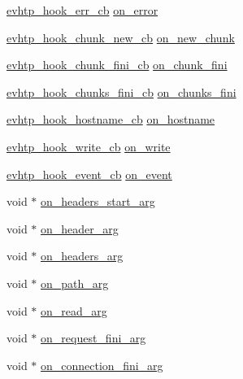 \begin{DoxyCompactItemize}
\hyperlink{evhtp_8h_a0a732d68aef3e27b8431cab5c1e9c0a2}{evhtp\-\_\-hook\-\_\-err\-\_\-cb} \hyperlink{structevhtp__hooks__s_ae5840f4ca13d16882f8bc84b306a7d9f}{on\-\_\-error}
\item 
\hyperlink{evhtp_8h_a28c0bf6ad71170459cd215edb41193ba}{evhtp\-\_\-hook\-\_\-chunk\-\_\-new\-\_\-cb} \hyperlink{structevhtp__hooks__s_a16e5898ad1b546019685b4c6854a0dfb}{on\-\_\-new\-\_\-chunk}
\item 
\hyperlink{evhtp_8h_a62e776563826a3f08a5b31b4738d07fa}{evhtp\-\_\-hook\-\_\-chunk\-\_\-fini\-\_\-cb} \hyperlink{structevhtp__hooks__s_a7905e89a5d4086104635ddc867e02fe1}{on\-\_\-chunk\-\_\-fini}
\item 
\hyperlink{evhtp_8h_afa076ce7b72bc507c919d9914b6cb8c3}{evhtp\-\_\-hook\-\_\-chunks\-\_\-fini\-\_\-cb} \hyperlink{structevhtp__hooks__s_a0801884b636d618c7fa881668996ce4a}{on\-\_\-chunks\-\_\-fini}
\item 
\hyperlink{evhtp_8h_ae907068ab1775d9dcbab30991f0817f8}{evhtp\-\_\-hook\-\_\-hostname\-\_\-cb} \hyperlink{structevhtp__hooks__s_a6de1097bdc1ddb3bf44c994e4e086f02}{on\-\_\-hostname}
\item 
\hyperlink{evhtp_8h_ad38e035817c84ac1a152115aab40c3cf}{evhtp\-\_\-hook\-\_\-write\-\_\-cb} \hyperlink{structevhtp__hooks__s_a1f9dee4096564721214ecfe05707510a}{on\-\_\-write}
\item 
\hyperlink{evhtp_8h_a12d14d9844d9a2eb8d9a9f81eeca192e}{evhtp\-\_\-hook\-\_\-event\-\_\-cb} \hyperlink{structevhtp__hooks__s_ac498d61ef3709ea14c1351eea77ed05d}{on\-\_\-event}
\item 
void $\ast$ \hyperlink{structevhtp__hooks__s_a5901f165f65b2ec87c0c0b274950be9f}{on\-\_\-headers\-\_\-start\-\_\-arg}
\item 
void $\ast$ \hyperlink{structevhtp__hooks__s_a854ac79bb3d5399c4ed366e542eea302}{on\-\_\-header\-\_\-arg}
\item 
void $\ast$ \hyperlink{structevhtp__hooks__s_aa4ea4765f3de173070b313ee276d8a43}{on\-\_\-headers\-\_\-arg}
\item 
void $\ast$ \hyperlink{structevhtp__hooks__s_ac828d71921d79c53bd3782082a392d09}{on\-\_\-path\-\_\-arg}
\item 
void $\ast$ \hyperlink{structevhtp__hooks__s_af1ca4346719c7e3b841867e153bc7504}{on\-\_\-read\-\_\-arg}
\item 
void $\ast$ \hyperlink{structevhtp__hooks__s_a6ff6528fe6d2018c55a718ca829e00be}{on\-\_\-request\-\_\-fini\-\_\-arg}
\item 
void $\ast$ \hyperlink{structevhtp__hooks__s_a85b8e90c05beef54c71c79ffb3666a91}{on\-\_\-connection\-\_\-fini\-\_\-arg}

\end{DoxyCompactItemize}
